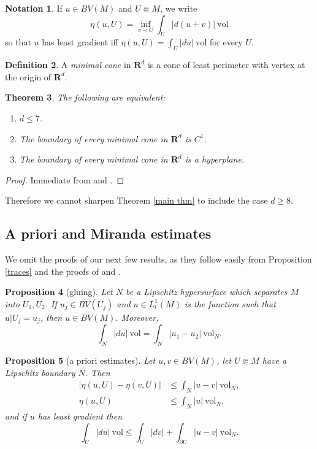 \documentclass[reqno,12pt,letterpaper]{amsart}
\newcommand{\RR}{\mathbf{R}}
\newcommand{\vol}{\mathrm{vol}}
\newcommand{\dfn}[1]{\emph{#1}\index{#1}}
\newtheorem{theorem}{Theorem}[section]
\newtheorem{proposition}[theorem]{Proposition}
\theoremstyle{definition}
\newtheorem{definition}[theorem]{Definition}
\newtheorem{notation}[theorem]{Notation}
\numberwithin{equation}{section}
\begin{document}
\begin{notation}
If $u \in BV(M)$ and $U \Subset M$, we write
$$\eta(u, U) = \inf_{v \prec U} \int_U |d(u+v)| ~\vol$$
so that $u$ has least gradient iff $\eta(u, U) = \int_U |du| ~\vol$ for every $U$.
\end{notation}

\begin{definition}
A \dfn{minimal cone} in $\RR^d$ is a cone of least perimeter with vertex at the origin of $\RR^d$.
\end{definition}

\begin{theorem}\label{minimal cones in R8}
The following are equivalent:
\begin{enumerate}
\item $d \leq 7$.
\item The boundary of every minimal cone in $\RR^d$ is $C^1$.
\item The boundary of every minimal cone in $\RR^d$ is a hyperplane.
\end{enumerate}
\end{theorem}
\begin{proof}
Immediate from \cite[Theorem 6.2.2]{Simons68} and \cite[Theorem A]{BOMBIERI1969}.
\end{proof}

Therefore we cannot sharpen Theorem \ref{main thm} to include the case $d \geq 8$.

\subsection{A priori and Miranda estimates}\label{MirandaStability}
We omit the proofs of our next few results, as they follow easily from Proposition \ref{traces} and the proofs of \cite[Teorema 2]{Miranda67} and \cite[Lemma 5.6, Remark 5.7]{Giusti77}.

\begin{proposition}[gluing]\label{gluing}
Let $N$ be a Lipschitz hypersurface which separates $M$ into $U_1,U_2$.
If $u_j \in BV(U_j)$ and $u \in L^1_l(M)$ is the function such that $u|U_j = u_j$, then $u \in BV(M)$.
Moreover,
\begin{equation}
\label{glued BV norm}
\int_N |du| ~\vol = \int_N |u_1 - u_2| ~\vol_N.
\end{equation}
\end{proposition}

\begin{proposition}[a priori estimates]\label{estimates on good set}
Let $u, v \in BV(M)$, let $U \Subset M$ have a Lipschitz boundary $N$. Then
\begin{align}
|\eta(u, U) - \eta(v, U)| &\leq \int_N |u - v| ~\vol_N, \label{a priori estimate 1}\\
\eta(u, U) &\leq \int_N |u| ~\vol_N, \label{a priori estimate 2}
\end{align}
and if $u$ has least gradient then
\begin{equation}
\int_U |du| ~\vol \leq \int_U |dv| + \int_{\partial U} |u - v| ~\vol_N. \label{a priori estimate 3}
\end{equation}
\end{proposition}
\end{document}

